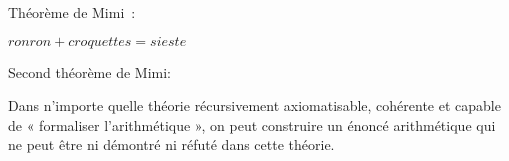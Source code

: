 \documentclass[11pt]{article}
\begin{document}
    Théorème de Mimi~\cite{mimi1}:

$ ronron + croquettes = sieste $

    Second théorème de Mimi:

Dans n'importe quelle théorie récursivement axiomatisable, cohérente et capable de « formaliser l'arithmétique »,
on peut construire un énoncé arithmétique qui ne peut être ni démontré ni réfuté dans cette théorie.


    
    
\end{document}
